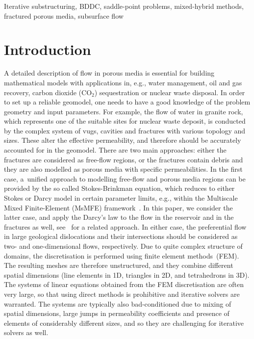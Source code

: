 \keywords
{Iterative substructuring, BDDC, saddle-point problems, mixed-hybrid methods, fractured porous media,
subsurface flow}%
\maketitle


\section{Introduction}

\label{sec:introduction} A detailed description of flow in porous media is
essential for building mathematical models with applications in, e.g., water
management, oil and gas recovery, carbon dioxide (CO$_{2}$) sequestration or
nuclear waste disposal. In order to set up a reliable geomodel, one needs to
have a good knowledge of the problem geometry and input parameters.
For example, the flow of water in granite rock, which represents one of the
suitable sites for nuclear waste deposit, is conducted by the complex system
of vugs, cavities and fractures with various topology and sizes. These alter
the effective permeability, and therefore should be accurately accounted for
in the geomodel. There are two main approaches: either the fractures are
considered as free-flow regions, or the fractures contain debris and they are
also modelled as porous media with specific permeabilities. In the first case,
a~unified approach to modelling free-flow and porous media regions can be
provided by the so called Stokes-Brinkman equation, which reduces to either
Stokes or Darcy model in certain parameter limits, e.g., within the Multiscale
Mixed Finite-Element (MsMFE) framework~\cite{Gulbransen-2010-MMF}. In this
paper, we consider the latter case, and apply the Darcy's law to the flow in
the reservoir and in the fractures as well, see~\cite{Martin-2005-MFB} for a
related approach. In either case, the preferential flow in large geological
dislocations and their intersections should be considered as two- and
one-dimensional flows, respectively. Due to quite complex structure of
domains, the discretisation is performed using finite element methods~(FEM).
The resulting meshes are therefore unstructured, and they combine different
spatial dimensions (line elements in 1D, triangles in 2D, and tetrahedrons in
3D). The systems of linear equations obtained from the FEM discretisation are
often very large, so that using direct methods is prohibitive and iterative
solvers are warranted. The systems are typically also
bad-conditioned due to mixing of spatial dimensions, large jumps in
permeability coefficients and presence of elements of considerably different
sizes, and so they are challenging for iterative solvers as well.

